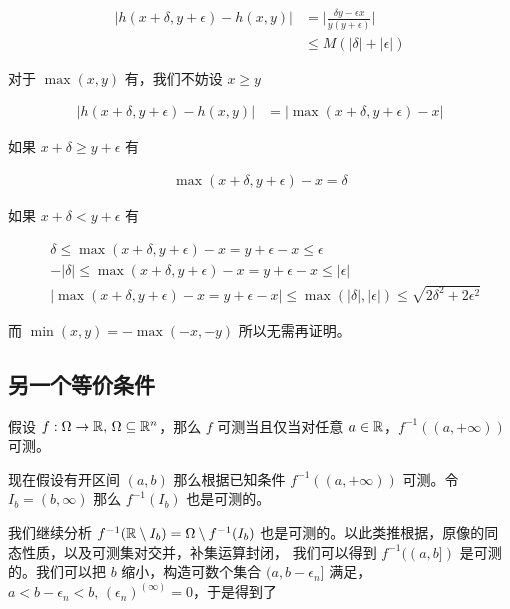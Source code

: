 \begin{align*}
\lvert h(x+\delta, y+\epsilon) - h(x,y) \rvert &= \lvert \frac{\delta y - \epsilon x }{y(y+\epsilon)}\rvert  \\
& \le M(\lvert \delta \rvert + \lvert \epsilon \rvert)
\end{align*}

对于 $\max(x,y)$ 有，我们不妨设 $x \ge y$

\begin{align*}
\lvert h(x+\delta, y+\epsilon) - h(x,y) \rvert &= \lvert \max(x+\delta, y+\epsilon) - x\rvert 
\end{align*}

如果 $x+\delta \ge y + \epsilon$ 有


\begin{align*}
\max(x+\delta, y+\epsilon) - x = \delta
\end{align*}

如果 $x+\delta < y + \epsilon$ 有

\begin{align*}
&\delta \le \max(x+\delta, y+\epsilon) - x = y + \epsilon - x \le \epsilon \\
& - \lvert \delta \rvert \le \max(x+\delta, y+\epsilon) - x = y + \epsilon - x \le \lvert \epsilon \rvert \\
& \lvert\max(x+\delta, y+\epsilon) - x = y + \epsilon - x \rvert \le \max(\lvert \delta \rvert, \lvert \epsilon \rvert) \le \sqrt{2\delta^2 + 2\epsilon^2}
\end{align*}


而 $\min(x,y) = - \max(-x, -y)$ 所以无需再证明。

\subsection{另一个等价条件}

假设 $f: \Omega \to \mathbb{R},\, \Omega \subseteq \mathbb{R}^n$，那么 $f$ 可测当且仅当对任意 $a \in \mathbb{R}$，$f^{-1}((a, +\infty))$ 可测。

现在假设有开区间 $(a,b)$ 那么根据已知条件 $f^{-1}((a,+\infty))$ 可测。令 $I_b = (b, \infty)$ 那么 $f^{-1}(I_b)$ 也是可测的。

我们继续分析 $f^{-1}(\mathbb{R} \setminus I_b) = \Omega \setminus f^{-1}(I_b)$ 也是可测的。以此类推根据，原像的同态性质，以及可测集对交并，补集运算封闭，
我们可以得到 $f^{-1}((a,b])$ 是可测的。我们可以把 $b$ 缩小，构造可数个集合 $(a, b - \epsilon_n]$ 满足，$a < b - \epsilon_n < b,\, (\epsilon_n)^{(\infty)} = 0$，于是得到了


